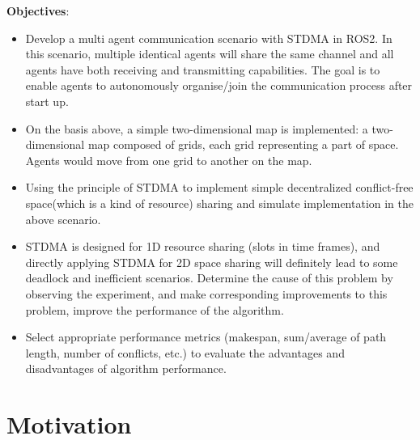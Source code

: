\documentclass[conference]{IEEEtran}
\begin{document}
\textbf{Objectives}:
\begin{itemize}
    \item Develop a multi agent communication scenario with STDMA in ROS2. In this scenario, multiple identical agents will share the same channel and all agents have both receiving and transmitting capabilities. The goal is to enable agents to autonomously organise/join the communication process after start up.
    \item On the basis above, a simple two-dimensional map is implemented: a two-dimensional map composed of grids, each grid representing a part of space. Agents would move from one grid to another on the map.
    \item Using the principle of STDMA \cite{STDMA} to implement simple decentralized conflict-free space(which is a kind of resource) sharing and simulate implementation in the above scenario.
    \item STDMA is designed for 1D resource sharing (slots in time frames), and directly applying STDMA for 2D space sharing will definitely lead to some deadlock and inefficient scenarios\cite{MAPF_Deadlock_Explain1}\cite{MAPF_Deadlock_Explain2}. Determine the cause of this problem by observing the experiment, and make corresponding improvements to this problem, improve the performance of the algorithm. 
    \item Select appropriate performance metrics (makespan, sum/average of path length, number of conflicts, etc.) to evaluate the advantages and disadvantages of algorithm performance. 
\end{itemize}


\section{Motivation}
\end{document}
